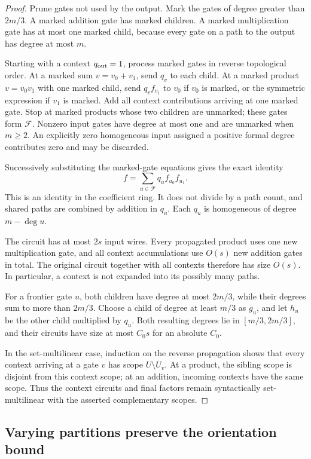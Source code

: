 \documentclass[11pt]{article}
\theoremstyle{definition}
\theoremstyle{remark}
\begin{document}
\begin{proof}
Prune gates not used by the output.  Mark the gates of degree greater
than $2m/3$.  A marked addition gate has marked children.  A marked
multiplication gate has at most one marked child, because every gate
on a path to the output has degree at most $m$.

Starting with a context $q_{\rm out}=1$, process marked gates in
reverse topological order.  At a marked sum $v=v_0+v_1$, send
$q_v$ to each child.  At a marked product $v=v_0v_1$ with one
marked child, send $q_vf_{v_1}$ to $v_0$ if $v_0$ is marked,
or the symmetric expression if $v_1$ is marked.  Add all context
contributions arriving at one marked gate.  Stop at marked products
whose two children are unmarked; these gates form $\mathcal F$.
Nonzero input gates have degree at most one and are unmarked when
$m\ge2$.  An explicitly zero homogeneous input assigned a positive
formal degree contributes zero and may be discarded.

Successively substituting the marked-gate equations gives the exact
identity
\[
 f=\sum_{u\in\mathcal F}q_u f_{u_0}f_{u_1}.
\]
This is an identity in the coefficient ring.  It does not divide by
a path count, and shared paths are combined by addition in $q_u$.
Each $q_u$ is homogeneous of degree $m-\deg u$.

The circuit has at most $2s$ input wires.  Every propagated product
uses one new multiplication gate, and all context accumulations use
$O(s)$ new addition gates in total.  The original circuit together
with all contexts therefore has size $O(s)$.  In particular, a
context is not expanded into its possibly many paths.

For a frontier gate $u$, both children have degree at most $2m/3$,
while their degrees sum to more than $2m/3$.  Choose a child of
degree at least $m/3$ as $g_u$, and let $h_u$ be the other child
multiplied by $q_u$.  Both resulting degrees lie in $[m/3,2m/3]$,
and their circuits have size at most $C_0s$ for an absolute $C_0$.

In the set-multilinear case, induction on the reverse propagation
shows that every context arriving at a gate $v$ has scope
$U\setminus U_v$.  At a product, the sibling scope is disjoint
from this context scope; at an addition, incoming contexts have
the same scope.  Thus the context circuits and final factors
remain syntactically set-multilinear with the asserted complementary
scopes.
\end{proof}

\subsection{Varying partitions preserve the orientation bound}
\end{document}
